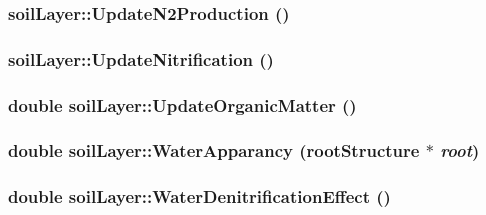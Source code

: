 \label{classsoil_layer_ae923fdabe8dc5e40195e3cf39b9ef569}
\hypertarget{classsoil_layer_a994f47ea2ca0d8a0d98515bb83600cf2}{
\subsubsection[{UpdateN2Production}]{ soilLayer::UpdateN2Production ()}}
\label{classsoil_layer_a994f47ea2ca0d8a0d98515bb83600cf2}
\hypertarget{classsoil_layer_a05e9eb7bc23f2ca60d2358eae2e3638c}{
\subsubsection[{UpdateNitrification}]{ soilLayer::UpdateNitrification ()}}
\label{classsoil_layer_a05e9eb7bc23f2ca60d2358eae2e3638c}
\hypertarget{classsoil_layer_a3499e118eccf838b5d9c7784cfbecee8}{
\subsubsection[{UpdateOrganicMatter}]{\setlength{\rightskip}{0pt plus 5cm}double soilLayer::UpdateOrganicMatter ()}}
\label{classsoil_layer_a3499e118eccf838b5d9c7784cfbecee8}
\hypertarget{classsoil_layer_a3c68ae8f97300b4e5e4cd3765c44427d}{
\subsubsection[{WaterApparancy}]{\setlength{\rightskip}{0pt plus 5cm}double soilLayer::WaterApparancy ({\bf rootStructure} $\ast$ {\em root})}}
\label{classsoil_layer_a3c68ae8f97300b4e5e4cd3765c44427d}
\hypertarget{classsoil_layer_acbeec61312f9f83d6553a268e9dcbde2}{
\subsubsection[{WaterDenitrificationEffect}]{\setlength{\rightskip}{0pt plus 5cm}double soilLayer::WaterDenitrificationEffect ()}}
